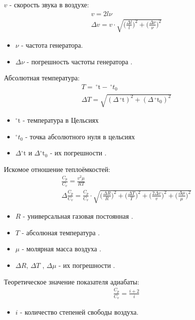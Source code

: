 \documentclass{article}
\begin{document}
$v$ - скорость звука в воздухе:
\begin{gather*}
    v= 2l\nu\\
    \Delta v = v \cdot \sqrt{\bigg( \frac{ \Delta{l}}{ l} \bigg)^2 + 
        \bigg( \frac{ \Delta{\nu}}{ \nu} \bigg)^2}
\end{gather*}
\begin{itemize}
    \item $\nu$ - частота генератора.
    \item $\Delta \nu$ - погрешность частоты генератора .
\end{itemize}

Абсолютная температура:
\begin{gather*}
    T = \,^{\circ}\text{t} - \,^{\circ}t_{ 0}\\
    \Delta T = \sqrt{(\Delta\,^{\circ}\text{t})^2+(\Delta\,^{\circ}\text{t}_{ 0})^2}
\end{gather*}
\begin{itemize}
    \item $^{\circ}\text{t}$ - температура в Цельсиях\\
    \item $^{\circ}t_{ 0}$ - точка абсолютного нуля в цельсиях\\
    \item $\Delta{^{\circ}\text{t}}$ и $\Delta{^{\circ}\text{t}_{ 0}}$ - их погрешности .    
\end{itemize}

Искомое отношение теплоёмкостей:
\begin{gather*}
    \frac{ C_{ p}}{ C_{ v}} = \frac{ v^2\mu}{ RT}\\
    \Delta \frac{ C_{ p}}{ C_{ v}} = \frac{ C_{ p}}{ C_{ v}} \cdot\sqrt{
        \bigg( \frac{ \Delta{R}}{ R} \bigg)^2 + \bigg( \frac{ \Delta{T}}{ T} \bigg)^2 +
        \bigg( \frac{ 2\Delta{v}}{ v} \bigg)^2 + \bigg( \frac{ \Delta{\mu}}{ \mu} \bigg)^2
    }
\end{gather*}
\begin{itemize}
    \item $R$ - универсальная газовая постоянная . 
    \item $T$ - абсолюная температура .
    \item $\mu$ - молярная масса воздуха . 
    \item $\Delta R$, $\Delta T$ , $\Delta \mu$ - их погрешности .
\end{itemize}

Теоретическое значение показателя адиабаты:
\begin{gather*}
    \frac{ C_{ p}}{ C_{ v}} = \frac{ i+2}{ i}
\end{gather*}
\begin{itemize}
    \item $i$ - количество степеней свободы воздуха.
\end{itemize}
\end{document}
